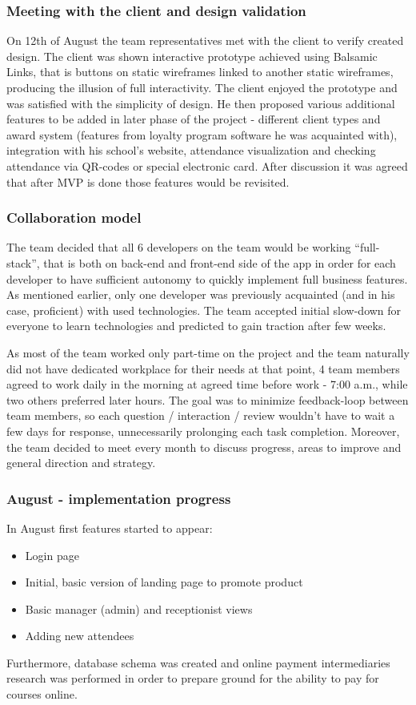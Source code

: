 \documentclass{article}
\begin{document}
\subsubsection{Meeting with the client and design validation}
On 12th of August the team representatives met with the client to verify created design. The client was shown interactive prototype achieved using Balsamic Links, that is buttons on static wireframes linked to another static wireframes, producing the illusion of full interactivity. The client enjoyed the prototype and was satisfied with the simplicity of design. He then proposed various additional features to be added in later phase of the project - different client types and award system (features from loyalty program software he was acquainted with), integration with his school's website, attendance visualization and checking attendance via QR-codes or special electronic card. After discussion it was agreed that after MVP is done those features would be revisited.

\subsubsection{Collaboration model}
The team decided that all 6 developers on the team would be working ``full-stack'', that is both on back-end and front-end side of the app in order for each developer to have sufficient autonomy to quickly implement full business features. As mentioned earlier, only one developer was previously acquainted (and in his case, proficient) with used technologies. The team accepted initial slow-down for everyone to learn technologies and predicted to gain traction after few weeks.

As most of the team worked only part-time on the project and the team naturally did not have dedicated workplace for their needs at that point, 4 team members agreed to work daily in the morning at agreed time before work - 7:00 a.m., while two others preferred later hours. The goal was to minimize feedback-loop between team members, so each question / interaction / review wouldn't have to wait a few days for response, unnecessarily prolonging each task completion. Moreover, the team decided to meet every month to discuss progress, areas to improve and general direction and strategy.

\subsubsection{August - implementation progress}
In August first features started to appear:
\begin{itemize}
\item Login page
\item Initial, basic version of landing page to promote product
\item Basic manager (admin) and receptionist views
\item Adding new attendees
\end{itemize}
Furthermore, database schema was created and online payment intermediaries research was performed in order to prepare ground for the ability to pay for courses online.
\end{document}
